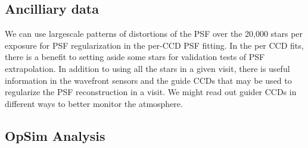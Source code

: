 \subsection{Ancilliary data}

We can use largescale patterns of distortions of the PSF over the 20,000 stars per exposure for
PSF regularization in the per-CCD PSF fitting. In the per CCD fits, there is a benefit to
setting aside some stars for validation tests of PSF extrapolation.
In addition to using all the stars in a given visit, there is useful information in the
wavefront sensors and the guide CCDs that may be used to regularize the PSF
reconstruction in a visit. We might read out guider CCDs in different ways to better
monitor the atmosphere.


\subsection{OpSim Analysis}






\newcommand\plottwo[2]{{%
\typeout{Plottwo included the files #1 #2}
\centering
\leavevmode
\texttt{[image: \#1]}%
\hfil
\texttt{[image: \#2]}%
}}%



